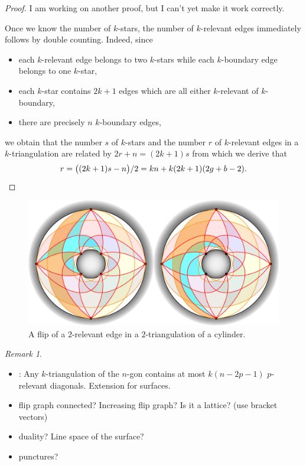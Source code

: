 \documentclass{amsart}
\theoremstyle{remark}
\newtheorem{remark}{Remark}[section]
\begin{document}
\begin{proof}
\medskip
I am working on another proof, but I can't yet make it work correctly.

\medskip
Once we know the number of $k$-stars, the number of $k$-relevant edges immediately follows by double counting.
Indeed, since
\begin{itemize}
\item each $k$-relevant edge belongs to two $k$-stars while each $k$-boundary edge belongs to one $k$-star,
\item each $k$-star contains $2k+1$ edges which are all either $k$-relevant of $k$-boundary,
\item there are precisely $n$ $k$-boundary edges,
\end{itemize}
we obtain that the number $s$ of $k$-stars and the number $r$ of $k$-relevant edges in a $k$-triangulation are related by
\(
2r + n = (2k+1) s
\)
from which we derive that
\[
r = \big( (2k+1)s-n \big)/2 = kn + k(2k + 1)(2g + b - 2).
\qedhere
\]
\end{proof}

\begin{figure}[t]
	\capstart
	\centerline{\includegraphics[scale=.5]{2triangCylinderFlip}}
	\caption{A flip of a $2$-relevant edge in a $2$-triangulation of a cylinder.}
	\label{fig:flipSurface}
\end{figure}


\begin{remark}
\begin{itemize}
\item \cite[Lem.~7.10]{PilaudSantos}: Any $k$-triangulation of the $n$-gon contains at most $k(n-2p-1)$ $p$-relevant diagonals. Extension for surfaces.
\item flip graph connected? Increasing flip graph? Is it a lattice? (use bracket vectors)
\item duality? Line space of the surface?
\item punctures?
\end{itemize}
\end{remark}
\end{document}
